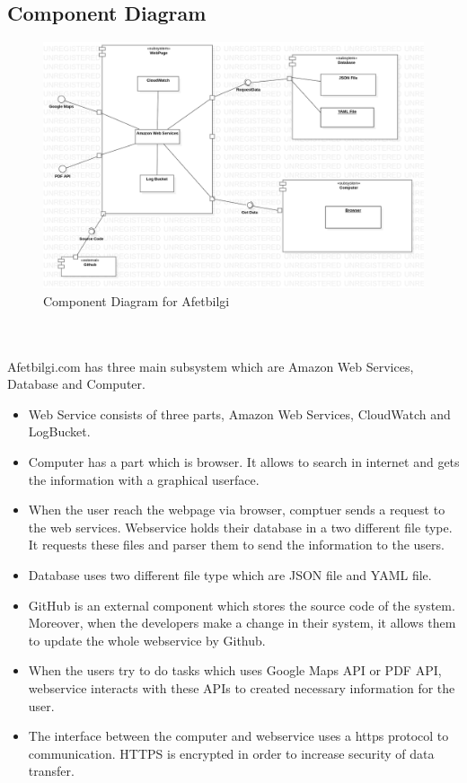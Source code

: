 \subsection{Component Diagram}

\begin{figure}[H]
    \includegraphics[scale = 0.4]{assets/ComponentDiagram.png}
    \caption[Component Diagram for Afetbilgi]{Component Diagram for Afetbilgi}
\end{figure}
~\\~\\
Afetbilgi.com has three main subsystem which are Amazon Web Services, Database and Computer.

\begin{itemize}
    \item Web Service consists of three parts, Amazon Web Services, CloudWatch and LogBucket.
    \item Computer has a part which is browser. It allows to search in internet and gets the information with a graphical userface.
    \item When the user reach the webpage via browser, comptuer sends a request to the web services. Webservice holds their database in a two different file type. It requests these files and parser them to send the information to the users. 
    \item Database uses two different file type which are JSON file and YAML file.
    \item GitHub is an external component which stores the source code of the system. Moreover, when the developers make a change in their system, it allows them to update the whole webservice by Github. 
    \item When the users try to do tasks which uses Google Maps API or PDF API, webservice interacts with these APIs to created necessary information for the user.
    \item The interface between the computer and webservice uses a https protocol to communication. HTTPS is encrypted in order to increase security of data transfer.
\end{itemize}

